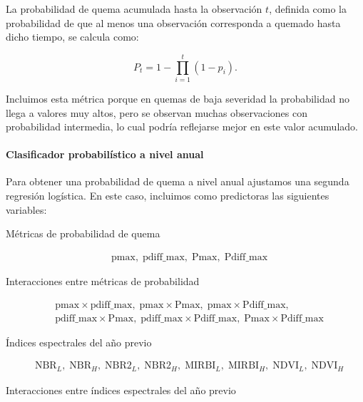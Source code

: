 \documentclass[11pt,a4paper]{article}
\begin{document}
La probabilidad de quema acumulada hasta la observación $t$, definida como la probabilidad de que al menos una observación corresponda a quemado hasta dicho tiempo, se calcula como:

\[
P_t = 1 - \prod_{i=1}^{t} \left( 1 - p_i \right).
\]

Incluimos esta métrica porque en quemas de baja severidad la probabilidad no llega a valores muy altos, pero se observan muchas observaciones con probabilidad intermedia, lo cual podría reflejarse mejor en este valor acumulado.

\paragraph{Clasificador probabilístico a nivel anual}

Para obtener una probabilidad de quema a nivel anual ajustamos una segunda regresión logística. En este caso, incluimos como predictoras las siguientes variables:

\vspace{1em}

Métricas de probabilidad de quema

\[
\begin{aligned}
&\text{pmax},\;
\text{pdiff\_max},\;
\text{Pmax},\;
\text{Pdiff\_max}
\end{aligned}
\]

Interacciones entre métricas de probabilidad

\[
\begin{aligned}
&\text{pmax} \times \text{pdiff\_max},\;
\text{pmax} \times \text{Pmax},\;
\text{pmax} \times \text{Pdiff\_max}, \\
&\text{pdiff\_max} \times \text{Pmax},\;
\text{pdiff\_max} \times \text{Pdiff\_max},\;
\text{Pmax} \times \text{Pdiff\_max}
\end{aligned}
\]

Índices espectrales del año previo

\[
\begin{aligned}
&\mathrm{NBR}_L,\;
\mathrm{NBR}_H,\;
\mathrm{NBR2}_L,\;
\mathrm{NBR2}_H,\;
\mathrm{MIRBI}_L,\;
\mathrm{MIRBI}_H,\;
\mathrm{NDVI}_L,\;
\mathrm{NDVI}_H
\end{aligned}
\]

Interacciones entre índices espectrales del año previo
\end{document}

